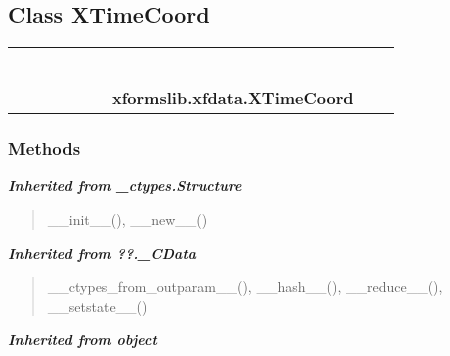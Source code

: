 \subsection{Class XTimeCoord}

    \label{xformslib:xfdata:XTimeCoord}
\begin{tabular}{cccccccccc}
\multicolumn{2}{r}{\settowidth{\BCL}{object}\multirow{2}{\BCL}{object}}
&&
&&
&&
  \\\cline{3-3}
  &&\multicolumn{1}{c|}{}
&&
&&
&&
  \\
\multicolumn{4}{r}{\settowidth{\BCL}{??.\_CData}\multirow{2}{\BCL}{??.\_CData}}
&&
&&
  \\\cline{5-5}
  &&&&\multicolumn{1}{c|}{}
&&
&&
  \\
\multicolumn{6}{r}{\settowidth{\BCL}{\_ctypes.Structure}\multirow{2}{\BCL}{\_ctypes.Structure}}
&&
  \\\cline{7-7}
  &&&&&&\multicolumn{1}{c|}{}
&&
  \\
&&&&&&\multicolumn{2}{l}{\textbf{xformslib.xfdata.XTimeCoord}}
\end{tabular}



  \subsubsection{Methods}


\large{\textbf{\textit{Inherited from \_ctypes.Structure}}}

\begin{quote}
\_\_init\_\_(), \_\_new\_\_()
\end{quote}

\large{\textbf{\textit{Inherited from ??.\_CData}}}

\begin{quote}
\_\_ctypes\_from\_outparam\_\_(), \_\_hash\_\_(), \_\_reduce\_\_(), \_\_setstate\_\_()
\end{quote}

\large{\textbf{\textit{Inherited from object}}}

